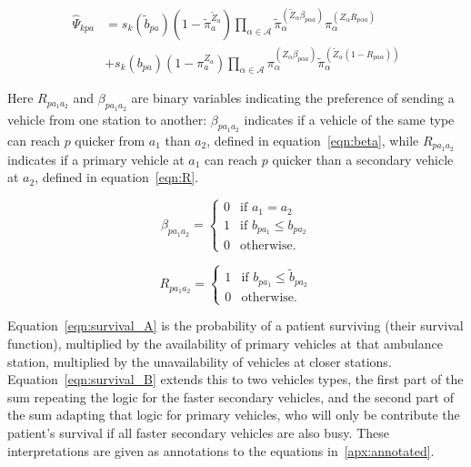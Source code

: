 \documentclass[preprint,12pt]{elsarticle}
\begin{document}
\begin{align}\label{eqn:survival_B}
\hat{\Psi}_{kpa} &= s_k\left(\tilde{b}_{pa}\right)
\left(1 - \tilde{\pi}_{a}^{\tilde{Z}_a} \right)
\prod_{\alpha \in \mathcal{A}}
\tilde{\pi}_{\alpha}^{\left(\tilde{Z}_{\alpha} \beta_{p\alpha a}\right)}
\pi_{\alpha}^{\left(Z_{\alpha} R_{p \alpha a}\right) } \nonumber \\
&+ s_k\left(b_{pa}\right) \left(1 - \pi_{a}^{Z_a} \right)
\prod_{\alpha \in \mathcal{A}}
\pi_{\alpha}^{\left(Z_{\alpha}\beta_{p\alpha a}\right)}
\tilde{\pi}_{\alpha}^{\left(\tilde{Z}_{\alpha}
\left(1 - R _{p a\alpha}\right)\right)}
\end{align}

Here $R_{p a_1 a_2}$ and $\beta_{p a_1 a_2}$ are binary variables indicating
the preference of sending a vehicle from one station to another:
$\beta_{p a_1 a_2}$ indicates if a vehicle of the same type can reach $p$
quicker from $a_1$ than $a_2$, defined in equation~\ref{eqn:beta}, while
$R_{p a_1 a_2}$ indicates if a primary vehicle at $a_1$ can reach $p$ quicker
than a secondary vehicle at $a_2$, defined in equation~\ref{eqn:R}.

\begin{equation}\label{eqn:beta}
\beta_{p a_1 a_2} = \begin{cases}
    0 & \text{if } a_1 = a_2\\
    1 & \text{if } b_{p a_1} \leq b_{p a_2}\\
    0 & \text{otherwise.}
\end{cases}
\end{equation}

\begin{equation}\label{eqn:R}
R_{p a_1 a_2} = \begin{cases}
    1 & \text{if } b_{p a_1} \leq \tilde{b}_{p a_2}\\
    0 & \text{otherwise.}
\end{cases}
\end{equation}

Equation~\ref{eqn:survival_A} is the probability of a patient surviving (their
survival function), multiplied by the availability of primary vehicles at that
ambulance station, multiplied by the unavailability of vehicles at closer
stations.
Equation~\ref{eqn:survival_B} extends this to two vehicles types, the first
part of the sum repeating the logic for the faster secondary vehicles, and the
second part of the sum adapting that logic for primary vehicles, who will only
be contribute the patient's survival if all faster secondary vehicles are also
busy. These interpretations are given as annotations to the equations
in~\ref{apx:annotated}.
\end{document}
